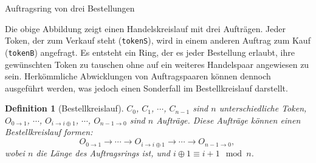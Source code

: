 \documentclass[UTF8,nofonts]{article}
\makeatletter
\newtheorem{definition}{Definition}[section]
\newenvironment{figurehere}
 {\def\@captype{figure}}
 {}
\makeatother
\begin{document}
\begin{multicols}{2}
\begin{center}
\begin{figurehere}

\caption{Auftragsring von drei Bestellungen}
\label{fig:ring}
\end{figurehere}
\end{center}


Die obige Abbildung zeigt einen Handelskreislauf mit drei Aufträgen. Jeder Token, der zum Verkauf steht (\verb|tokenS|), wird in einem anderen Auftrag zum Kauf (\verb|tokenB|) angefragt. Es entsteht ein Ring, der es jeder Bestellung erlaubt, ihre gewünschten Token zu tauschen ohne auf ein weiteres Handelspaar angewiesen zu sein. Herkömmliche Abwicklungen von Auftragspaaren können dennoch ausgeführt werden, was jedoch einen Sonderfall im Bestellkreislauf darstellt.

\begin{definition}[Bestellkreislauf] $C_{0}$, $C_{1}$, $\cdots$, $C_{n-1}$ sind $n$ unterschiedliche Token, $O_{0\rightarrow 1}$, $\cdots$, $O_{i\rightarrow i\oplus 1}$, $\cdots$, $O_{n-1 \rightarrow 0}$ sind $n$ Aufträge. Diese Aufträge können einen Bestellkreislauf formen:
$$O_{0\rightarrow 1} \rightarrow \cdots \rightarrow O_{i\rightarrow i\oplus 1} \rightarrow \cdots \rightarrow O_{n-1\rightarrow 0} \text{, }$$
wobei $n$ die Länge des Auftragsrings ist, und $i\oplus 1 \equiv i+1 \mod n$.
\end{definition}


\end{multicols}
\end{document}
